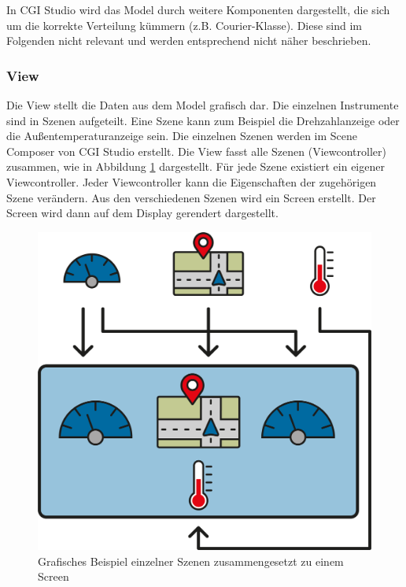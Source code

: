 In CGI Studio wird das Model durch weitere Komponenten dargestellt, die sich um die korrekte Verteilung kümmern (z.B. Courier-Klasse). Diese sind im Folgenden nicht relevant und werden entsprechend nicht näher beschrieben.\\

\subsubsection{View}

Die View stellt die Daten aus dem Model grafisch dar. Die einzelnen Instrumente sind in Szenen aufgeteilt. Eine Szene kann zum Beispiel die Drehzahlanzeige oder die Außentemperaturanzeige sein. Die einzelnen Szenen werden im Scene Composer von CGI Studio erstellt. Die View fasst alle Szenen (Viewcontroller) zusammen, wie in Abbildung \ref{fig:scene} dargestellt. Für jede Szene existiert ein eigener Viewcontroller. Jeder Viewcontroller kann die Eigenschaften der zugehörigen Szene verändern. Aus den verschiedenen Szenen wird ein Screen erstellt. Der Screen wird dann auf dem Display gerendert dargestellt.\\

\begin{figure}[htb]
	\centering
	\includegraphics[width=14cm]{img/2_stand_der_technik/scene}
	\caption{Grafisches Beispiel einzelner Szenen zusammengesetzt zu einem Screen}
	\label{fig:scene}
\end{figure}




